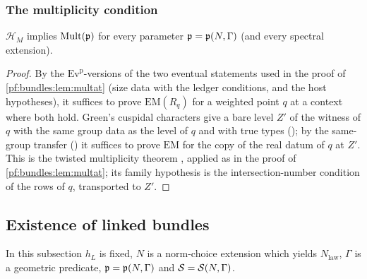 \subsubsection{The multiplicity condition}\label{pf:bundles:multcond}

\begin{lemma}\label{pf:bundles:lem:multcond}
$\mathcal H_M$ implies $\mathrm{Mult}(\mathfrak p)$ for every parameter $\mathfrak p=\mathfrak p(N,\Gamma)$ (and every spectral extension).
\end{lemma}

\begin{proof}
By the $\mathrm{Ev}^{\mathrm p}$-versions of the two eventual statements used in the proof of \cref{pf:bundles:lem:multat} (size data with
the ledger conditions, and the host hypotheses), it suffices to prove $\mathrm{EM}(R_q)$ for a weighted point $q$ at a context where both
hold. Green's cuspidal characters give a bare level $Z'$ of the witness of $q$ with the same group data as the level of $q$ and with true
types (); by the same-group transfer
() it suffices to prove $\mathrm{EM}$ for the copy of the real
datum of $q$ at $Z'$. This is the twisted multiplicity theorem , applied as in the proof
of \cref{pf:bundles:lem:multat}; its family hypothesis is the intersection-number condition of the rows of $q$, transported to $Z'$.
\end{proof}

\subsection{Existence of linked bundles}\label{pf:bundles:exbl}

In this subsection $h_L$ is fixed, $N$ is a norm-choice extension which yields $N_{\mathrm{law}}$, $\Gamma$ is a geometric predicate,
$\mathfrak p=\mathfrak p(N,\Gamma)$ and $\mathcal S=\mathcal S(N,\Gamma)$.

